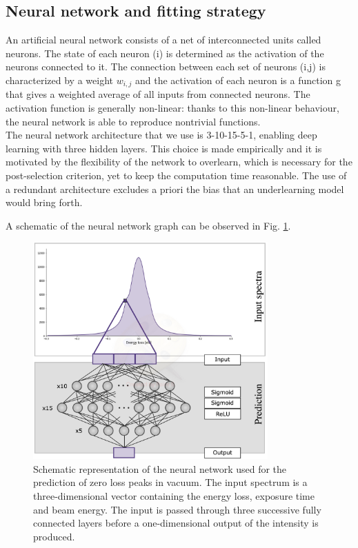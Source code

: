 \documentclass[11pt,a4paper]{article}
\numberwithin{equation}{section}
\numberwithin{figure}{section}
\numberwithin{table}{section}
\begin{document}
\subsection{Neural network and fitting strategy}
An artificial neural network consists of a net of interconnected units called neurons. The state of each neuron (i) is determined as the activation of the neurons connected to it. The connection between each set of neurons (i,j) is characterized by a weight $w_{i,j}$ and the activation of each neuron is a function g that gives a weighted average of all inputs from connected neurons. The activation function is generally non-linear: thanks to this non-linear behaviour, the neural network is able to reproduce nontrivial functions. \\
The neural network architecture that we use is 3-10-15-5-1, enabling deep learning with three hidden layers. This choice is made empirically and it is motivated by the flexibility of the network to overlearn, which is necessary for the post-selection criterion, yet to keep the computation time reasonable. The use of a redundant architecture excludes a priori the bias that an underlearning model would bring forth. 

A schematic of the neural network graph can be observed in Fig. \ref{architecture}. 
\begin{figure}[H]
    \centering
    \includegraphics[width=90mm]{plots/architecture.jpg}
    \caption{Schematic representation of the neural network used for the prediction of zero loss peaks in vacuum. The input spectrum is a three-dimensional vector containing the energy loss, exposure time and beam energy. The input is passed through three successive fully connected layers before a one-dimensional output of the intensity is produced.}
    \label{architecture}
\end{figure}
\end{document}
